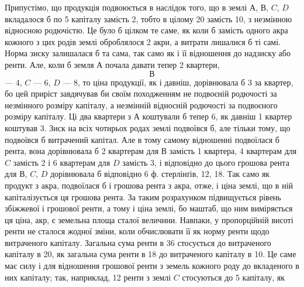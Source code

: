 Припустімо, що продукція подвоюється в наслідок того, що в землі $А$,
$В$, $C$, $D$ вкладалося б по 5 капіталу замість 2, тобто
в цілому 20 замість 10, з незмінною відносною родючістю.
Це було б цілком те саме, як коли б замість одного акра кожного з цих
родів землі оброблялося 2 акри, а витрати лишалися б ті самі. Норма зиску
залишалася б та сама, так само як і її відношення до надзиску або ренти. Але,
коли б земля $А$ почала давати тепер 2 квартери, $$В$$ — 4, $C$ — 6, $D$ — 8, то ціна
продукції, як і давніш, дорівнювала б 3 за квартер, бо цей приріст
завдячував би своїм походженням не подвоєній родючості за незмінного розміру
капіталу, а незмінній відносній родючості за подвоєного розміру капіталу. Ці
два квартери з $А$ коштували б тепер 6, як давніш 1 квартер коштував
3. Зиск на всіх чотирьох родах землі подвоївся б, але тільки
тому, що подвоївся б витрачений капітал. Але в тому самому відношенні подвоїлася
б рента, вона дорівнювала б 2 квартерам для $В$ замість 1 квартера, 4 квартерам
для $C$ замість 2 і 6 квартерам для $D$ замість 3, і відповідно до цього
грошова рента для $В$, $C$, $D$ дорівнювала б відповідно 6 ф. стерлінґів, 12, 18. Так само як продукт з акра, подвоїлася б і грошова
рента з акра, отже, і ціна землі, що в ній капіталізується ця грошова рента. За
таким розрахунком підвищується рівень збіжжевої і грошової ренти, а тому і
ціна землі, бо маштаб, що ним виміряється ця ціна, акр, є земельна площа
сталої величини. Навпаки, у пропорційній висоті ренти не сталося жодної зміни,
коли обчислювати її як норму ренти щодо витраченого капіталу. Загальна сума
ренти в 36 стосується до витраченого капіталу в 20, як загальна сума ренти
в 18 до витраченого капіталу в 10. Це саме має силу і для відношення грошової
ренти з земель кожного роду до вкладеного в них капіталу; так, наприклад,
12 ренти з землі $C$ стосуються до 5 капіталу, як
\parbreak{}  %
